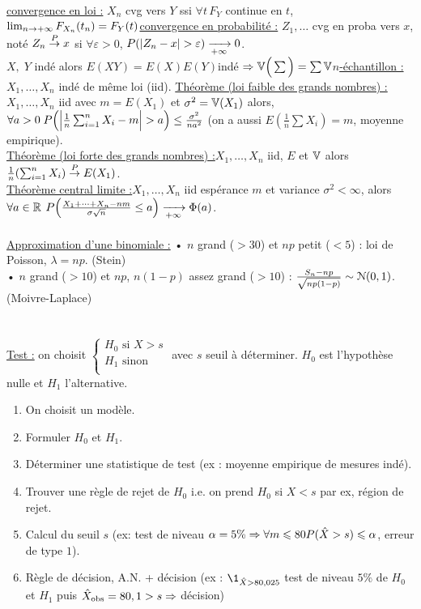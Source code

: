 \documentclass[12 pt]{book}
\begin{document}
\text{ }\\
\underline{convergence en loi :} $X_n$ cvg vers $Y$ ssi $\forall t\, F_Y$ continue en $t$, $\lim_{n\to +\infty} F_{X_n}(t_n)=F_Y(t)$\newline \underline{convergence en probabilité :} $Z_1,\dots$ cvg en proba vers $x$, noté $Z_n \overset{P}{\rightarrow} x$ si $\forall\varepsilon>0$, $P(|Z_n - x|>\varepsilon)\TI 0$.\\
$X,\; Y$ indé alors $E(XY)=E(X)E(Y)$\qquad indé $\Rightarrow \mathbb{V}\Big(\sum\Big) = \sum \mathbb{V}$\newline \underline{$n$-échantillon :} $X_1,\dots,X_n$ indé de même loi (iid).\newline
\underline{Théorème (loi faible des grands nombres) :} $X_1,\dots,X_n$ iid avec $m=E(X_1)$ et $\sigma^2=\mathbb{V}(X_1)$ alors, $\forall a>0\; P\Big(\Big| \frac{1}{n} \SN X_i -m\Big|>a\Big)\leq \frac{\sigma^2}{na^2}$ (on a aussi $E(\frac{1}{n}\sum X_i) =m$, moyenne empirique).\\
\underline{Théorème (loi forte des grands nombres) :}$X_1,\dots,X_n$ iid, $E$ et $\mathbb{V}$ alors $\frac{1}{n}(\sum_{i=1}^n X_i)\overset{P}{\rightarrow} E(X_1)$.\\
\underline{Théorème central limite :}$X_1,\dots,X_n$ iid espérance $m$ et variance $\sigma^2<\infty$, alors $\forall a\in \mathbb{R}$ $P\Big(\frac{X_1 + \dots + X_n - nm}{\sigma\sqrt{n}}\leq a\Big) \xrightarrow[+\infty]{} \Phi(a)$.\\
\text{ }\\
\underline{Approximation d'une binomiale :}
• $n$ grand ($>30$) et $np$ petit ($<5$) : loi de Poisson, $\lambda=np$. (Stein)\\
• $n$ grand ($>10$) et $np$, $n(1-p)$ assez grand ($>10$) : $\frac{S_n-np}{\sqrt{np(1-p)}}\sim \mathcal{N}(0,1)$. (Moivre-Laplace)\\
\text{ }\\ 
\text{ }\\
\underline{Test :} on choisit $\begin{cases}H_0\text{ si }X>s\\ H_1\text{ sinon}\\\end{cases}$ avec $s$ seuil à déterminer. $H_0$ est l'hypothèse nulle et $H_1$ l'alternative.\\
\begin{enumerate}[label=\protect\circled{\arabic*}]
\item On choisit un modèle.
\item Formuler $H_0$ et $H_1$.
\item Déterminer une statistique de test (ex : moyenne empirique de mesures indé).
\item Trouver une règle de rejet de $H_0$ i.e. on prend $H_0$ si $X<s$ par ex, région de rejet.
\item Calcul du seuil $s$ (ex: test de niveau $\alpha=5\%\Rightarrow\forall m\leqslant 80 P(\hat{X}>s)\leqslant\alpha$, erreur de type $1$).
\item Règle de décision, A.N. + décision (ex : $\1_{\hat{X}>80,025}$ test de niveau $5\%$ de $H_0$ et $H_1$ puis $\hat{X}_{\text{obs}}=80,1>s\Rightarrow$ décision)
\end{enumerate}
\end{document}

